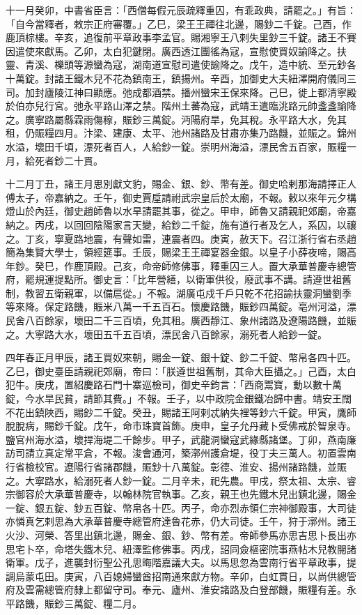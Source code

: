 \begin{pinyinscope}
 十一月癸卯，中書省臣言：「西僧每假元辰疏釋重囚，有乖政典，請罷之。」有旨：「自今當釋者，敕宗正府審覆。」乙巳，梁王王禪往北邊，賜鈔二千錠。己酉，作鹿頂棕樓。辛亥，追復前平章政事李孟官。賜湘寧王八剌失里鈔三千錠。諸王不賽因遣使來獻馬。乙卯，太白犯鍵閉。廣西透江團徭為寇，宣慰使買奴諭降之。扶靈、青溪、櫟頭等源蠻為寇，湖南道宣慰司遣使諭降之。戊午，造中統、至元鈔各十萬錠。封諸王鐵木兒不花為鎮南王，鎮揚州。辛酉，加御史大夫紐澤開府儀同三司。加封廬陵江神曰顯應。弛成都酒禁。播州蠻宋王保來降。己巳，徙上都清寧殿於伯亦兒行宮。弛永平路山澤之禁。階州土蕃為寇，武靖王遣臨洮路元帥盞盞諭降之。廣寧路屬縣霖雨傷稼，賑鈔三萬錠。沔陽府旱，免其稅。永平路大水，免其租，仍賑糧四月。汴梁、建康、太平、池州諸路及甘肅亦集乃路饑，並賑之。錦州水溢，壞田千頃，漂死者百人，人給鈔一錠。崇明州海溢，漂民舍五百家，賑糧一月，給死者鈔二十貫。



 十二月丁丑，諸王月思別獻文豹，賜金、銀、鈔、幣有差。御史哈剌那海請擇正人傅太子，帝嘉納之。壬午，御史賈垕請祔武宗皇后於太廟，不報。敕以來年元夕構燈山於內廷，御史趙師魯以水旱請罷其事，從之。甲申，師魯又請親祀郊廟，帝嘉納之。丙戌，以回回陰陽家言天變，給鈔二千錠，施有道行者及乞人，系囚，以禳之。丁亥，寧夏路地震，有聲如雷，連震者四。庚寅，赦天下。召江浙行省右丞趙簡為集賢大學士，領經筵事。壬辰，賜梁王王禪宴器金銀。以皇子小薛夜啼，賜高年鈔。癸巳，作鹿頂殿。己亥，命帝師修佛事，釋重囚三人。置大承華普慶寺總管府，罷規運提點所。御史言：「比年營繕，以衛軍供役，廢武事不講。請遵世祖舊制，教習五衛親軍，以備扈從。」不報。湖廣屯戍千戶只乾不花招諭扶靈洞蠻劉季等來降。保定路饑，賑米八萬一千五百石。懷慶路饑，賑鈔四萬錠。亳州河溢，漂民舍八百餘家，壞田二千三百頃，免其租。廣西靜江、象州諸路及遼陽路饑，並賑之。大寧路大水，壞田五千五百頃，漂民舍八百餘家，溺死者人給鈔一錠。



 四年春正月甲辰，諸王買奴來朝，賜金一錠、銀十錠、鈔二千錠、幣帛各四十匹。乙巳，御史臺臣請親祀郊廟，帝曰：「朕遵世祖舊制，其命大臣攝之。」己酉，太白犯牛。庚戌，置紹慶路石門十寨巡檢司，御史辛鈞言：「西商鬻寶，動以數十萬錠，今水旱民貧，請節其費。」不報。壬子，以中政院金銀鐵冶歸中書。靖安王闊不花出鎮陜西，賜鈔二千錠。癸丑，賜諸王阿剌忒納失裡等鈔六千錠。甲寅，鷹師脫脫病，賜鈔千錠。戊午，命市珠寶首飾。庚申，皇子允丹藏卜受佛戒於智泉寺。鹽官州海水溢，壞捍海堤二千餘步。甲子，武龍洞蠻寇武緣縣諸堡。丁卯，燕南廉訪司請立真定常平倉，不報。浚會通河，築漷州護倉堤，役丁夫三萬人。初置雲南行省檢校官。遼陽行省諸郡饑，賑鈔十八萬錠。彰德、淮安、揚州諸路饑，並賑之。大寧路水，給溺死者人鈔一錠。二月辛未，祀先農。甲戌，祭太祖、太宗、睿宗御容於大承華普慶寺，以翰林院官執事。乙亥，親王也先鐵木兒出鎮北邊，賜金一錠、銀五錠、鈔五百錠、幣帛各十匹。丙子，命亦烈赤領仁宗神御殿事，大司徒亦憐真乞剌思為大承華普慶寺總管府達魯花赤，仍大司徒。壬午，狩于漷州。諸王火沙、河榮、答里出鎮北邊，賜金、銀、鈔、幣有差。帝師參馬亦思吉思卜長出亦思宅卜卒，命塔失鐵木兒、紐澤監修佛事。丙戌，詔同僉樞密院事燕帖木兒教閱諸衛軍。戊子，進襲封衍聖公孔思晦階嘉議大夫。以馬思忽為雲南行省平章政事，提調烏蒙屯田。庚寅，八百媳婦蠻酋招南通來獻方物。辛卯，白虹貫日，以尚供總管府及雲需總管府隸上都留守司。奉元、廬州、淮安諸路及白登部饑，賑糧有差。永平路饑，賑鈔三萬錠、糧二月。




\end{pinyinscope}
